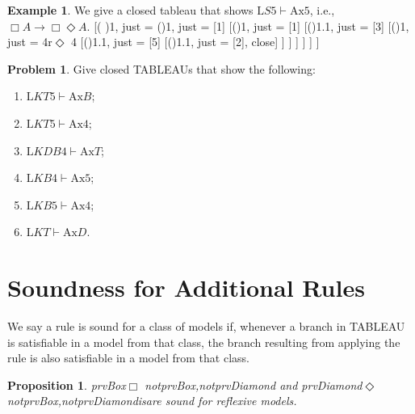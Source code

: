 \documentclass[10pt,a4paper]{article}
\newcommand*{\olup}[1]{\MakeUppercase{#1}}
\theoremstyle{plain}
\newtheorem{prop}[thm]{Proposition}
\theoremstyle{definition}
\newtheorem{ex}[thm]{Example}
\newtheorem{prob}{Problem}[section]
\theoremstyle{remark}
\newcommand*{\olfileid}[3]{}
\newcommand*{\olsection}[1]{\section*{#1}}
\newcommand*{\ollabel}[1]{\label{#1}}
\newenvironment{oltableau}{}{}
\providecommand{\lif}{\mathbin{\rightarrow}}
\providecommand{\Proves}{\mathrel{\vdash}}
\providecommand{\pFmla}[2]{#1(#2)}
\providecommand{\formula}{\relax}
\providecommand{\True}{\top}
\providecommand{\False}{\bot}
\providecommand{\Log}{\ensuremath{\mathrm{L}}}
\providecommand{\iftag}[1]{#1}
\providecommand{\TAss}[1]{}
\providecommand{\TRule}[1]{}
\providecommand{\Ax}{\mathrm{Ax}}
\providecommand{\formula}[1]{#1}
\providecommand{\iftag}{}
\begin{document}
\begin{ex}
  We give a closed tableau that shows $\Log{S5} \Proves \Ax{5}$, i.e.,
  $\Box A \lif \Box\Diamond A$.
  \begin{oltableau}
    [\pFmla{\False}{\Box\formula{A} \lif \Box\Diamond \formula{A}}{1},
      just = \TAss
      [\pFmla{\True}{\Box \formula{A}}{1}, just = {\TRule{\False}{\lif}[1]}
        [\pFmla{\False}{\Box\Diamond \formula{A}}{1},
          just = {\TRule{\False}{\lif}[1]}
          [\pFmla{\False}{\Diamond \formula{A}}{1.1},
            just = {\TRule{\False}{\Box}[3]}
            [\pFmla{\False}{\Diamond \formula{A}}{1},
              just = {4r$\Diamond$ 4}
              [\pFmla{\False}{\formula{A}}{1.1},
                just = {\TRule{\False}{\Diamond}[5]}
                [\pFmla{\True}{\formula{A}}{1.1},
                  just = {\TRule{\True}{\Box}[2]}, close]
              ]
            ]
          ]
        ]
      ]
    ]
  \end{oltableau}
\end{ex}

\begin{prob}
Give closed \olup{tableau}s that show the following:
  \begin{enumerate}
  \item $\Log{KT5} \Proves \Ax{B}$;
  \item $\Log{KT5} \Proves \Ax{4}$;
  \item $\Log{KDB4} \Proves \Ax{T}$;
  \item $\Log{KB4} \Proves \Ax{5}$;
  \item $\Log{KB5} \Proves \Ax{4}$;
  \item $\Log{KT} \Proves \Ax{D}$.
  \end{enumerate}
\end{prob}





\olfileid{nml}{tab}{msn}
      
\olsection{Soundness for Additional Rules}

We say a rule is sound for a class of models if, whenever a branch in
\olup{tableau} is satisfiable in a model from that class, the branch
resulting from applying the rule is also satisfiable in a model from
that class.

\begin{prop}
  \ollabel{prop:soundness-T} 
  \iftag{prvBox}{\Ax{T}$\Box$}{}%
  \iftag{notprvBox,notprvDiamond}{}{ and }%
  \iftag{prvDiamond}{\Ax{T}$\Diamond$}{}
  \iftag{notprvBox,notprvDiamond}{is}{are}
  sound for reflexive models.
\end{prop}
\end{document}
